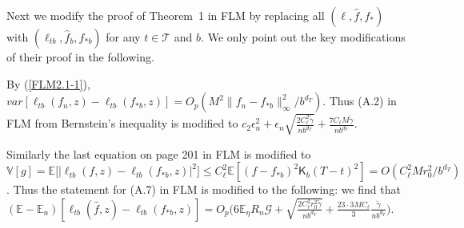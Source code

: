 \documentclass[lettersize, 12pt]{article}
\begin{document}
Next we modify the proof of Theorem~1 in FLM by replacing all $(\ell, \hat f, f_\ast)$ with $(\ell_{tb}, \hat f_b, f_{\ast b})$ for any $t\in \mathcal{T}$ and $b$.
We only point out the key modifications of their proof in the following.



By (\ref{FLM2.1-1}), $var[\ell_{tb}(f_n, z) - \ell_{tb}(f_{\ast b}, z)] = O_p\left( M^2\|f_n -f_{\ast b}\|_\infty^2 /b^{d_T}\right)$.
Thus (A.2) in FLM from Bernstein's inequality is modified to $c_2 \epsilon_n^2 + \epsilon_n \sqrt{\frac{2C_\ell^2 \tilde \gamma}{nb^{d_T}}} + \frac{7 C_\ell M\tilde \gamma}{nb^{d_T}}$.

Similarly the last equation on page 201 in FLM is modified to
$\mathbb{V}[g] = \mathbb{E}\Big[\big|\ell_{tb}(f, z) - \ell_{tb}(f_{\ast b}, z)\big|^2 \Big] \leq C_\ell^2\mathbb{E}[(f-f_{\ast b})^2\mathsf{K}_b(T-t)^2] = O\left(C_\ell^2 M r_0^2/b^{d_T}\right)$.
Thus the statement for (A.7) in FLM is modified to the following:
we find that $(\mathbb{E} - \mathbb{E}_n)[\ell_{tb}(\hat f,z) - \ell_{tb}(f_{\ast b}, z)] = O_p\Big( 6 \mathbb{E}_\eta R_n \mathcal{G} + \sqrt{\frac{2C_\ell^2 r_0^2 \tilde \gamma}{nb^{d_T}}} + \frac{23\cdot 3MC_\ell}{3} \frac{\tilde \gamma}{nb^{d_T}}\Big)$.

\end{document}
